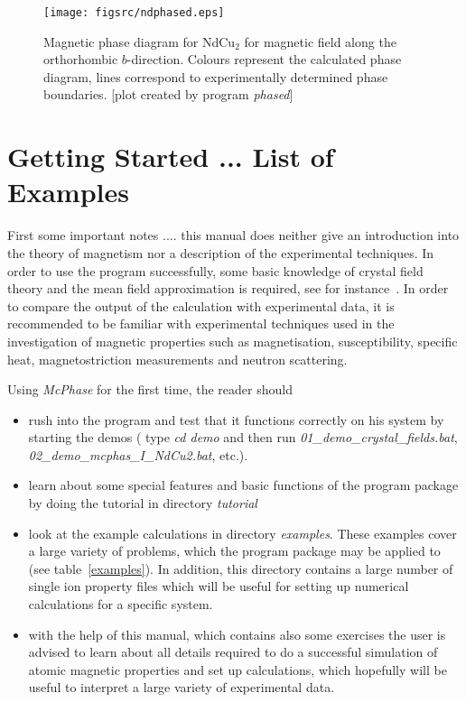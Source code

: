 \documentclass[twoside]{article}
\newcommand{\prg}{\sl}
\begin{document}
\begin{figure}[ht]\begin{center}
\texttt{[image: figsrc/ndphased.eps]}
\caption{\label{ndphased}
Magnetic phase diagram for NdCu$_2$ for magnetic field along
the orthorhombic $b$-direction. Colours represent the calculated phase
diagram, lines correspond to experimentally determined phase boundaries.
[plot created by program {\prg phased}]
}
\end{center}
\end{figure}


\section{Getting Started ... List of Examples}  

First some important notes .... this manual does neither give an introduction into the theory of 
magnetism nor a description of the experimental techniques. In order
to use the program successfully, some basic knowledge of crystal field theory and the mean field
approximation is required, see for instance~\cite{jensen91-1}.
In order to compare the output of the calculation with experimental
data, it is recommended to be familiar with  experimental techniques used
in the investigation of magnetic properties
such as magnetisation, susceptibility, specific heat, magnetostriction
measurements and neutron scattering.

Using {\prg McPhase} for the first time, the reader should
\begin{itemize}
\item
rush into the program and test that it functions correctly on his system
by starting the demos ( type {\prg cd demo} and then run {\prg 01\_demo\_crystal\_fields.bat},{\prg %
02\_demo\_mcphas\_I\_NdCu2.bat}, etc.).  
\item 
learn about some special features and basic functions of the program package by
doing the tutorial in directory {\prg tutorial}
\item
look at the example calculations in directory {\prg examples}. These examples cover a large variety
of problems, which the program package may be applied to (see table~\ref{examples}). In addition, this directory
contains a large number of single ion property files which will be useful for setting
up numerical calculations for a specific system.
\item
with the help of this manual, which contains also some exercises the user is advised 
to learn about all details required to do a successful simulation of atomic magnetic properties
and set up calculations, which hopefully will be useful to interpret a large variety of 
experimental data. 
\end{itemize}
\end{document}
